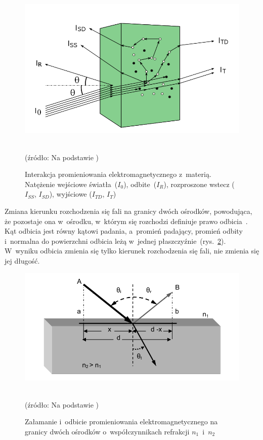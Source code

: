 \begin{figure}[ht]
	\centerline{\includegraphics[scale = 0.50]{graphic/light_interaction.png}}
	\caption{Interakcja promieniowania elektromagnetycznego z~materią. Natężenie wejściowe światła~($I_{0}$), odbite~($I_{R}$), 
	rozproszone wstecz ($I_{SS}$, $I_{SD}$), wyjściowe ($I_{TD}$, $I_{T}$)}
	~\\	
	(źródło: Na podstawie \cite{Valisue:Thesis:2011})
	\label{rys:light_interaction}
\end{figure}
Zmiana kierunku rozchodzenia się fali na granicy dwóch ośrodków, powodująca, że pozostaje ona w~ośrodku, w~którym się rozchodzi definiuje prawo 
odbicia~\cite{Feyn:2012}. Kąt odbicia jest równy kątowi padania, a~promień padający, promień odbity i~normalna do powierzchni odbicia leżą w~jednej 
płaszczyźnie~(rys.~\ref{rys:refraction}). W~wyniku odbicia zmienia się tylko kierunek rozchodzenia się fali, nie zmienia się jej długość.

\begin{figure}[ht]
	\centerline{\includegraphics[scale = 0.53]{graphic/refraction.png}}
	\caption{Załamanie i~odbicie promieniowania elektromagnetycznego na granicy dwóch ośrodków o~współczynnikach refrakcji $n_{1}$~i~$n_{2}$}
	~\\
	(źródło: Na podstawie \cite{Yavari:PhD:2006})
	\label{rys:refraction}
\end{figure}



